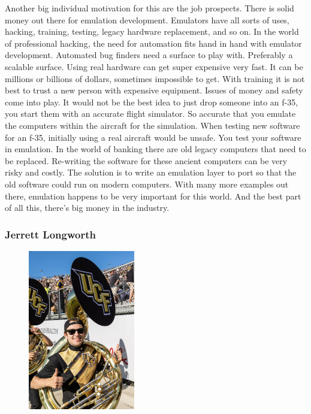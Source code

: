 \documentclass[
    paper=letter,
    parskip=half,
    fontsize=12pt,
    titlepage=firstiscover,
    toc=bibliography,
    numbers=endperiod
]{scrartcl}
\begin{document}
Another big individual motivation for this are the job prospects. There
is solid money out there for emulation development. Emulators have all
sorts of uses, hacking, training, testing, legacy hardware replacement,
and so on. In the world of professional hacking, the need for automation
fits hand in hand with emulator development. Automated bug finders need
a surface to play with. Preferably a scalable surface. Using real
hardware can get super expensive very fast. It can be millions or
billions of dollars, sometimes impossible to get. With training it is
not best to trust a new person with expensive equipment. Issues of money
and safety come into play. It would not be the best idea to just drop
someone into an f-35, you start them with an accurate flight simulator.
So accurate that you emulate the computers within the aircraft for the
simulation. When testing new software for an f-35, initially using a
real aircraft would be unsafe. You test your software in emulation. In
the world of banking there are old legacy computers that need to be
replaced. Re-writing the software for these ancient computers can be
very risky and costly. The solution is to write an emulation layer to
port so that the old software could run on modern computers. With many
more examples out there, emulation happens to be very important for this
world. And the best part of all this, there's big money in the industry.

\subsubsection{Jerrett Longworth}
\begin{figure}[H]
    \includegraphics[height=7cm]{profile-jerrett}
\end{figure}
\end{document}
